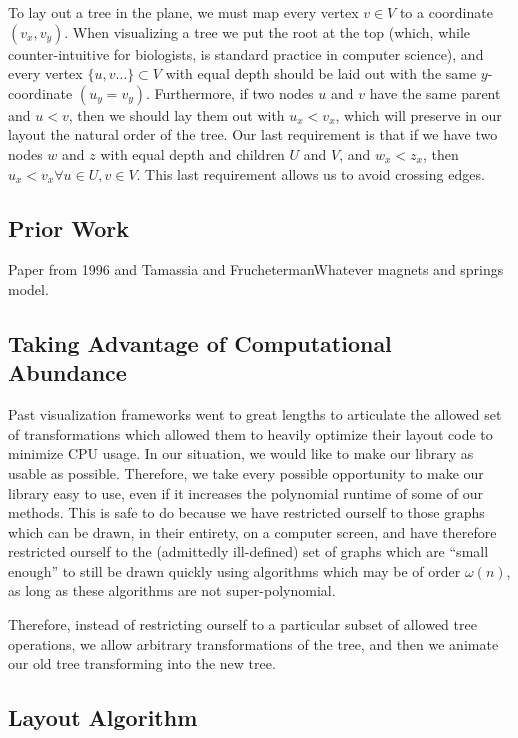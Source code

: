 \documentclass{article}
\begin{document}
To lay out a tree in the plane, we must map every vertex $v \in V$ to a
coordinate $(v_x, v_y)$.  When visualizing a tree we put the root at the top
(which, while counter-intuitive for biologists, is standard practice in
computer science), and every vertex $\{u,v \ldots\} \subset V$ with equal depth
should be laid out with the same $y$-coordinate $(u_y = v_y)$.  Furthermore, if
two nodes $u$ and $v$ have the same parent and $u < v$, then we should lay them
out with $u_x < v_x$, which will preserve in our layout the natural order of the tree.  Our last requirement is that if we have two nodes $w$ and $z$ with equal depth and children $U$ and $V$, and $w_x < z_x$, then $u_x < v_x \forall u\in U, v\in V$.  This last requirement allows us to avoid crossing edges.

\subsection{Prior Work}

Paper from 1996 and Tamassia and FruchetermanWhatever magnets and springs
model.

\subsection{Taking Advantage of Computational Abundance}

Past visualization frameworks went to great lengths to articulate the allowed
set of transformations which allowed them to heavily optimize their layout code
to minimize CPU usage.  In our situation, we would like to make our library as
usable as possible.  Therefore, we take every possible opportunity to make our
library easy to use, even if it increases the polynomial runtime of some of our
methods.  This is safe to do because we have restricted ourself to those graphs
which can be drawn, in their entirety, on a computer screen, and have therefore
restricted ourself to the (admittedly ill-defined) set of graphs which are
``small enough'' to still be drawn quickly using algorithms which may be of
order $\omega(n)$, as long as these algorithms are not super-polynomial.

Therefore, instead of restricting ourself to a particular subset of allowed
tree operations, we allow arbitrary transformations of the tree, and then we
animate our old tree transforming into the new tree.

\subsection{Layout Algorithm}
\end{document}
